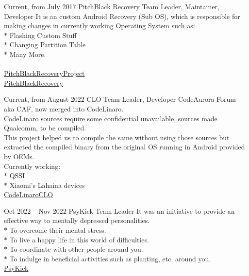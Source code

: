 \documentclass[
	10pt, %
	]{FreemanCV}
\begin{document}
\begin{paracol}{2}
\jobentry
	{Current, from July 2017} %
	{} %
	{PitchBlack Recovery} %
	{Team Leader, Maintainer, Developer} %
	{It is an custom Android Recovery (Sub OS), which is responsible for making changes in currently working Operating System such as:\\
	 $*$ Flashing Custom Stuff\\
	 $*$ Changing Partition Table\\
	 $*$ Many More.\\
	 \\
	\raisebox{-1pt}{\faGithubSquare} \href{https://github.com/PitchBlackRecoveryProject}{PitchBlackRecoveryProject}\\
	\raisebox{-1pt}{\faGlobe} \href{https://pitchblackrecovery.com}{PitchBlackRecovery}} %


\jobentry
	{Current, from August 2022} %
	{} %
	{CLO} %
	{Team Leader, Developer} %
	{CodeAurora Forum aka CAF, now merged into CodeLinaro. \\
	CodeLinaro sources require some confidential unavailable, sources made Qualcomm, to be compiled. \\
	This project helped us to compile the same without using those sources but extracted the compiled binary from the original OS running in Android provided by OEMs. \\
	Currently working:\\
	 $*$ QSSI\\
	 $*$ Xiaomi's Lahaina devices\\
	\raisebox{-1pt}{\faGithubSquare} \href{https://github.com/CodeLinaroCLO}{CodeLinaroCLO}} %



\jobentry
	{Oct 2022 -- Nov 2022} %
	{} %
	{PsyKick} %
	{Team Leader} %
	{It was an initiative to provide an effective way to mentally depressed personalities.\\
	 $*$ To overcome their mental stress.\\
	 $*$ To live a happy life in this world of difficulties.\\
	 $*$ To coordinate with other people around you.\\
	 $*$ To indulge in beneficial activities such as planting, etc. around you.\\
	 \raisebox{-1pt}{\faGithubSquare} \href{https://github.com/PsyKick-MIT}{PsyKick}} %


\end{paracol}
\end{document}
